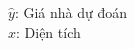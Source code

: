 \documentclass[preview]{standalone}
\begin{document}
\begin{center}
$\hat{y}$: Giá nhà dự đoán\\$x$: Diện tích
\end{center}
\end{document}

